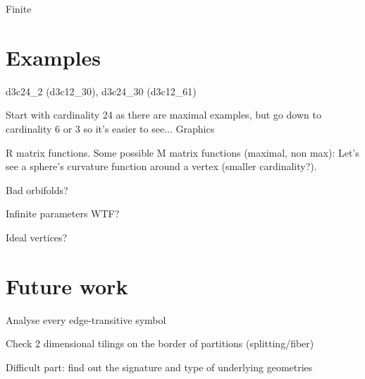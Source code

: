\documentclass[12pt,a4paper]{article}
\begin{document}
Finite

\section{Examples}
d3c24\_2 (d3c12\_30), d3c24\_30 (d3c12\_61)

Start with cardinality 24 as there are maximal examples, but go down to
cardinality 6 or 3 so it's easier to see... Graphics

R matrix functions. Some possible M matrix functions (maximal, non max): Let's
see a sphere's curvature function around a vertex (smaller cardinality?).

Bad orbifolds?

Infinite parameters WTF?

Ideal vertices?


\section{Future work}
Analyse every edge-transitive symbol

Check 2 dimensional tilings on the border of partitions (splitting/fiber)

Difficult part: find out the signature and type of underlying geometries

\nocite{DHM93,D87,Du88,H93,LM90,Ma67,M94,T82,VS93,F94,F03}


\end{document}
